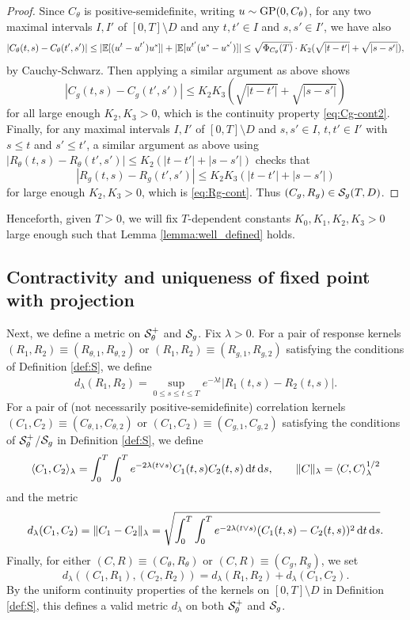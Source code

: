 \begin{proof}
Since $C_\theta$ is positive-semidefinite, writing $u \sim \operatorname{GP}(0,C_\theta)$,
for any two maximal intervals $I,I'$ of $[0,T] \setminus D$ and any
$t,t' \in I$ and $s,s' \in I'$, we have also
\[|C_\theta(t,s)-C_\theta(t',s')|
\leq |\mathbb{E}[(u^t-u^{t'})u^s]|+|\mathbb{E}[u^{t'}(u^s-u^{s'})]|
\leq \sqrt{\Phi_{C_\theta}(T)} \cdot K_2(\sqrt{|t-t'|}+\sqrt{|s-s'|}),\]
by Cauchy-Schwarz. Then applying a similar argument as above shows
\[|C_g(t,s)-C_g(t',s')| \leq K_2K_3(\sqrt{|t-t'|}+\sqrt{|s-s'|})\]
for all large enough $K_2,K_3>0$,
which is the continuity property \eqref{eq:Cg-cont2}.
Finally, for any maximal intervals $I,I'$ of
$[0,T] \setminus D$ and $s,s' \in I$, $t,t' \in I'$ with $s \leq t$ and $s' \leq
t'$, a similar argument as above using $|R_\theta(t,s)-R_\theta(t',s')| \leq
K_2(|t-t'|+|s-s'|)$ checks that
\[|R_g(t,s)-R_g(t',s')| \leq K_2K_3(|t-t'|+|s-s'|)\]
for large enough $K_2,K_3>0$, which is \eqref{eq:Rg-cont}.
Thus $(C_g,R_g)\in \mathcal{S}_g(T,D)$.
\end{proof}

Henceforth, given $T>0$, we will fix $T$-dependent constants
$K_0,K_1,K_2,K_3>0$ large enough such that Lemma \ref{lemma:well_defined}
holds.

\subsection{Contractivity and uniqueness of fixed point with projection}

Next, we define a metric on $\mathcal{S}_\theta^+$ and $\mathcal{S}_g$. Fix $\lambda>0$.
For a pair of response kernels $(R_1,R_2) \equiv (R_{\theta,1},R_{\theta,2})$ 
or $(R_1,R_2) \equiv (R_{g,1},R_{g,2})$ satisfying the conditions of
Definition \ref{def:S}, we define
\begin{align}\label{eq:metric-response}
  d_\lambda(R_1, R_2) = \sup_{0 \leq s \leq t \leq T} e^{-\lambda
t}|R_1(t,s)-R_2(t,s)|.
\end{align} 
For a pair of (not necessarily positive-semidefinite) correlation kernels
$(C_1,C_2) \equiv (C_{\theta,1},C_{\theta,2})$ 
or $(C_1,C_2) \equiv (C_{g,1},C_{g,2})$ satisfying the conditions of
$\mathcal{S}_\theta^+$/$\mathcal{S}_g$ in Definition \ref{def:S}, we define
\begin{align}\label{eq:hilbertinnerproduct}
\langle C_1, C_2 \rangle_{\lambda}=\int_0^T \int_0^T e^{-2\lambda
(t\vee s)}C_1(t,s) C_2(t,s)\,\mathrm{d} t\,\mathrm{d} s,
\qquad \|C\|_\lambda=\langle C,C \rangle_{\lambda}^{1/2}
 \end{align} 
and the metric
\begin{align}
\label{eq:metric-covariance}
  d_\lambda(C_1, C_2)=\|C_1-C_2\|_\lambda= \sqrt{\int_0^T \int_0^T e^{-2\lambda (t\vee s)}(C_1(t,s) - C_2(t,s))^2 \,\mathrm{d} t \,\mathrm{d} s}.
\end{align}
Finally, for either
$(C,R) \equiv (C_\theta,R_\theta)$ or $(C,R) \equiv (C_g,R_g)$, we set
\[d_\lambda((C_1,R_1),(C_2,R_2))
=d_\lambda(R_1,R_2)+d_\lambda(C_1,C_2).\]
By the uniform continuity properties of the kernels on $[0,T] \setminus D$
in Definition \ref{def:S},
this defines a valid metric $d_\lambda$ on both $\mathcal{S}_\theta^+$ and
$\mathcal{S}_g$.

